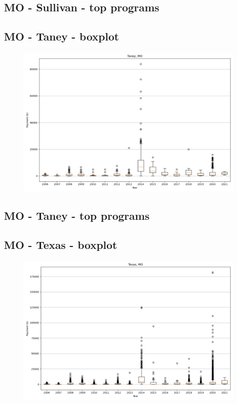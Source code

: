 \subsection*{MO - Sullivan - top programs}

\newpage
\subsection*{MO - Taney - boxplot}
\begin{figure}[h]
\centering
\includegraphics[width=7in]{../output/boxplots/counties/Taney-MO_boxplot.png}
\end{figure}


\subsection*{MO - Taney - top programs}

\newpage
\subsection*{MO - Texas - boxplot}
\begin{figure}[h]
\centering
\includegraphics[width=7in]{../output/boxplots/counties/Texas-MO_boxplot.png}
\end{figure}


